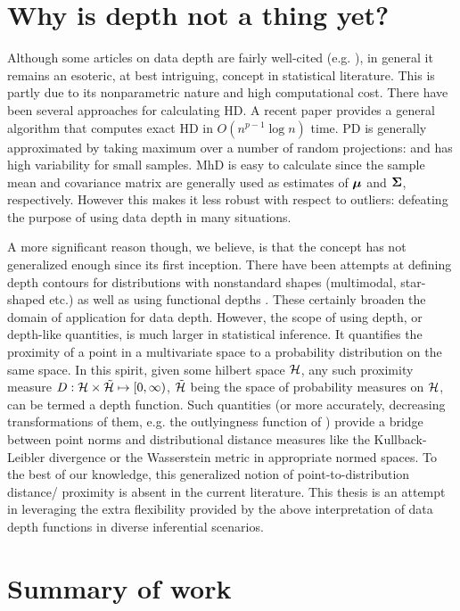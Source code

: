 \section{Why is depth not a thing yet?}
Although some articles on data depth are fairly well-cited (e.g. \cite{LiuPareliusSingh99,VardiZhang00}), in general it remains an esoteric, at best intriguing, concept in statistical literature. This is partly due to its nonparametric nature and high computational cost. There have been several approaches for calculating HD. A recent paper \citep{Dyckerhoff16} provides a general algorithm that computes exact HD in $O(n^{p-1}\log n)$ time. PD is generally approximated by taking maximum over a number of random projections: and has high variability for small samples. MhD is easy to calculate since the sample mean and covariance matrix are generally used as estimates of ${\boldsymbol{\mu}}$ and ${\boldsymbol{\Sigma}}$, respectively. However this makes it less robust with respect to outliers: defeating the purpose of using data depth in many situations.

A more significant reason though, we believe, is that the concept has not generalized enough since its first inception. There have been attempts at defining depth contours for distributions with nonstandard shapes (multimodal, star-shaped etc.) \citep{PaindaveineJASA2013,Chernozhukov17} as well as using functional depths \citep{NarisettyNair16,Sguera16}. These certainly broaden the domain of application for data depth. However, the scope of using depth, or depth-like quantities, is much larger in statistical inference. It quantifies the proximity of a point in a multivariate space to a probability distribution on the same space. In this spirit, given some hilbert space ${\cal{H}}$, any such proximity measure $D:{\cal{H}} \times \tilde {{\cal{H}}} \mapsto [0, \infty)$, $\tilde {{\cal{H}}}$ being the space of probability measures on ${\cal{H}}$, can be termed a depth function. Such quantities (or more accurately, decreasing transformations of them, e.g. the outlyingness function of \cite{zuo00}) provide a bridge between point norms and distributional distance measures like the Kullback-Leibler divergence or the Wasserstein metric in appropriate normed spaces. To the best of our knowledge, this generalized notion of point-to-distribution distance/ proximity is absent in the current literature. This thesis is an attempt in leveraging the extra flexibility provided by the above interpretation of data depth functions in diverse inferential scenarios. 

\section{Summary of work}

